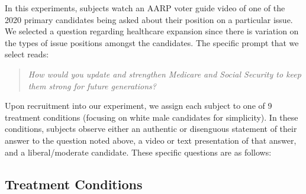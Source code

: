 In this experiments, subjects watch an AARP voter guide video of one
of the 2020 primary candidates being asked about their position on a
particular issue. We selected a question regarding healthcare
expansion since there is variation on the types of issue positions
amongst the candidates. The specific prompt that we select reads:

\begin{quotation}  
\noindent \emph{How would you update and strengthen Medicare and Social Security to
keep them strong for future generations?}
\end{quotation}
  
Upon recruitment into our experiment, we assign each subject to one of
9 treatment conditions (focusing on white male candidates for
simplicity). In these conditions, subjects observe either an authentic
or disenguous statement of their answer to the question noted above, a
video or text presentation of that answer, and a liberal/moderate
candidate. These specific questions are as follows:

\subsection{Treatment Conditions}

